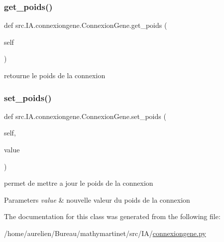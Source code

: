\subsubsection{\texorpdfstring{get\+\_\+poids()}{get\_poids()}}
{\footnotesize\ttfamily def src.\+I\+A.\+connexiongene.\+Connexion\+Gene.\+get\+\_\+poids (\begin{DoxyParamCaption}\item[{}]{self }\end{DoxyParamCaption})}



retourne le poids de la connexion 

\mbox{\label{classsrc_1_1_i_a_1_1connexiongene_1_1_connexion_gene_ad6f8d0dc7d4b9a76c702dc1c014808d2}} 
\subsubsection{\texorpdfstring{set\+\_\+poids()}{set\_poids()}}
{\footnotesize\ttfamily def src.\+I\+A.\+connexiongene.\+Connexion\+Gene.\+set\+\_\+poids (\begin{DoxyParamCaption}\item[{}]{self,  }\item[{}]{value }\end{DoxyParamCaption})}



permet de mettre a jour le poids de la connexion 


\begin{DoxyParams}{Parameters}
{\em value} & nouvelle valeur du poids de la connexion \\
\hline
\end{DoxyParams}


The documentation for this class was generated from the following file\+:\begin{DoxyCompactItemize}
\item 
/home/aurelien/\+Bureau/mathymartinet/src/\+I\+A/\hyperlink{connexiongene_8py}{connexiongene.\+py}\end{DoxyCompactItemize}
